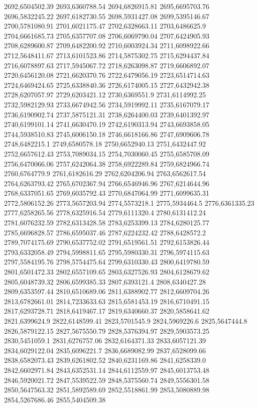 2692,6504502.39
2693,6360788.54
2694,6826915.81
2695,6695703.76
2696,5832245.22
2697,6182730.55
2698,5931427.08
2699,5395146.67
2700,5781080.91
2701,6021175.47
2702,6328663.11
2703,6486625.9
2704,6661685.73
2705,6357707.08
2706,6069790.04
2707,6424905.93
2708,6289600.87
2709,6482200.92
2710,6003924.34
2711,6098922.66
2712,5648411.67
2713,6101523.86
2714,5875302.75
2715,6294437.84
2716,6078897.63
2717,5945067.72
2718,6263098.87
2719,6606892.07
2720,6456120.08
2721,6620370.76
2722,6479056.19
2723,6514714.63
2724,6469424.65
2725,6338840.36
2726,6174005.15
2727,6432942.38
2728,6207057.97
2729,6203421.12
2730,6369551.9
2731,6114992.25
2732,5982129.93
2733,6674942.56
2734,5919992.11
2735,6167079.17
2736,6190902.74
2737,5875121.31
2738,6264400.03
2739,6401392.97
2740,6199101.14
2741,6630470.19
2742,6190313.94
2743,6693858.05
2744,5938510.83
2745,6006150.18
2746,6618166.86
2747,6909606.78
2748,6482215.1
2749,6580578.18
2750,6652940.13
2751,6432447.92
2752,6657612.43
2753,7089034.15
2754,7030060.45
2755,6585708.09
2756,6470066.06
2757,6242064.38
2758,6922289.84
2759,6824966.74
2760,6764779.9
2761,6182616.29
2762,6204206.94
2763,6562617.54
2764,6263793.42
2765,6702367.94
2766,6546946.96
2767,6214644.96
2768,6337051.65
2769,6035792.43
2770,6847064.99
2771,6099635.31
2772,5806152.26
2773,5657203.94
2774,5573218.1
2775,5934464.5
2776,6361335.23
2777,6258265.56
2778,6325916.54
2779,6111320.4
2780,6131412.24
2781,6076232.59
2782,6313428.58
2783,6253399.13
2784,6280125.77
2785,6696828.57
2786,6595037.46
2787,6224232.42
2788,6428572.2
2789,7074175.69
2790,6537752.02
2791,6519561.51
2792,6153826.44
2793,6332058.49
2794,5998811.65
2795,5980330.31
2796,5974115.63
2797,5584195.76
2798,5754475.64
2799,6310330.43
2800,6419780.59
2801,6501472.33
2802,6557109.65
2803,6327526.93
2804,6128679.62
2805,6048739.32
2806,6599385.33
2807,6393121.4
2808,6340427.28
2809,6353597.44
2810,6510689.06
2811,6388902.77
2812,6609704.26
2813,6782661.01
2814,7233633.63
2815,6581453.19
2816,6710491.15
2817,6293728.71
2818,6419467.17
2819,6340660.37
2820,5858641.62
2821,6399624.9
2822,6148599.41
2823,5701545.9
2824,5969226.6
2825,5647444.8
2826,5879122.15
2827,5675550.79
2828,5376394.97
2829,5903573.25
2830,5451059.1
2831,6276757.06
2832,6164371.33
2833,6057121.39
2834,6029122.04
2835,6096221.7
2836,6689082.99
2837,6528099.66
2838,6582073.43
2839,6261802.52
2840,6231169.86
2841,6258339.0
2842,6602971.84
2843,6352531.14
2844,6112559.97
2845,6013753.48
2846,5920021.72
2847,5539522.59
2848,5375560.74
2849,5556301.58
2850,5647563.32
2851,5892589.69
2852,5518861.99
2853,5080889.98
2854,5267686.46
2855,5404509.38
